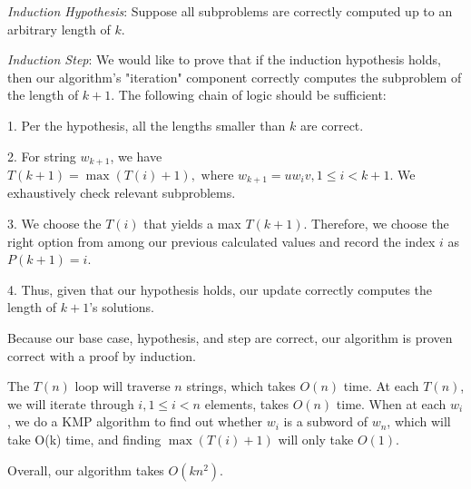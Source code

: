 \textit{Induction Hypothesis}: Suppose all subproblems are correctly computed up to an arbitrary length of $k$.

\textit{Induction Step}: We would like to prove that if the induction hypothesis holds, then our algorithm's "iteration" component correctly computes the subproblem of the length of $k+1$. The following chain of logic should be sufficient:

1. Per the hypothesis, all the lengths smaller than $k$ are correct.

2. For string $w_{k+1}$, we have $T(k+1) = \max(T(i) + 1), \text{ where }w_{k+1}=u w_{i} v, 1 \leq i < k+1$. We exhaustively check relevant subproblems.

3. We choose the $T(i)$ that yields a max $T(k+1)$. Therefore, we choose the right option from among our previous calculated values and record the index $i$ as $P(k+1)=i$.

4. Thus, given that our hypothesis holds, our update correctly computes the length of $k+1$'s solutions.

Because our base case, hypothesis, and step are correct, our algorithm is proven correct with a proof by induction.




The $T(n)$ loop will traverse $n$ strings, which takes $O(n)$ time. At each $T(n)$, we will iterate through $i, 1
\leq i < n$ elements, takes $O(n)$ time. When at each $w_i$, we do a KMP algorithm to find out whether $w_i$ is a subword of $w_n$, which will take O(k) time, and finding $\max(T(i) + 1)$ will only take $O(1)$.

Overall, our algorithm takes $O(kn^2)$.



